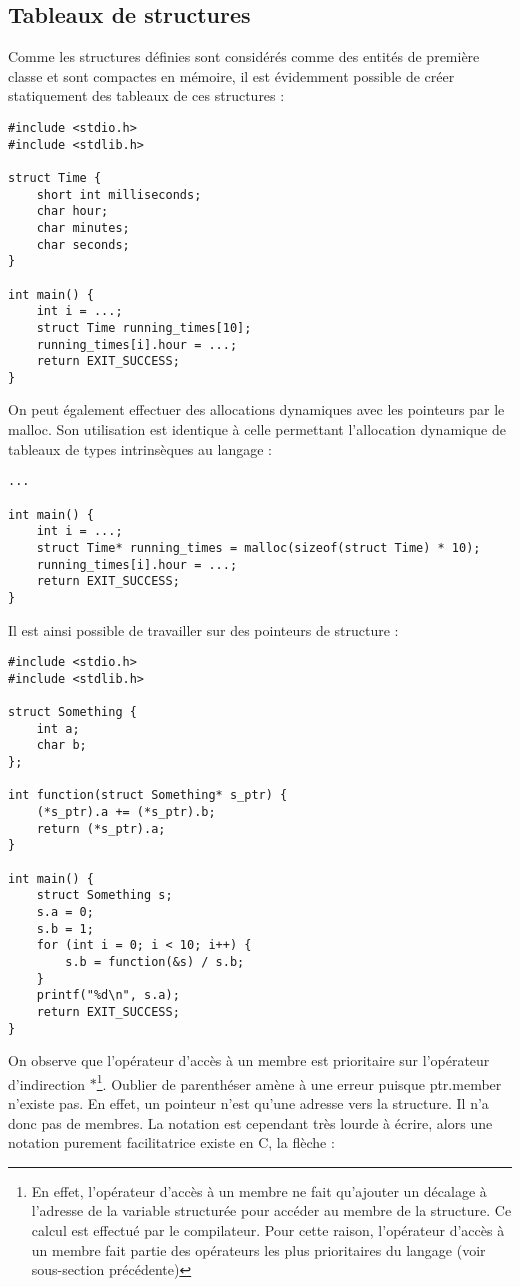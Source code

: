 \documentclass[../../../main.tex]{subfiles}
\begin{document}
\subsection{Tableaux de structures}
\label{sub:tableaux_de_structures}
Comme les structures définies sont considérés comme des entités de première classe et sont compactes en mémoire, il est évidemment possible de créer statiquement des tableaux de ces structures :
\begin{verbatim}
#include <stdio.h>
#include <stdlib.h>

struct Time {
	short int milliseconds;
	char hour;
	char minutes;
	char seconds;
}

int main() {
	int i = ...;
	struct Time running_times[10];
	running_times[i].hour = ...;
	return EXIT_SUCCESS;
}
\end{verbatim}
On peut également effectuer des allocations dynamiques avec les pointeurs par le \textsf{malloc}. Son utilisation est identique à celle permettant l'allocation dynamique de tableaux de types intrinsèques au langage :
\begin{verbatim}
...

int main() {
	int i = ...;
	struct Time* running_times = malloc(sizeof(struct Time) * 10);
	running_times[i].hour = ...;
	return EXIT_SUCCESS;
}
\end{verbatim}
Il est ainsi possible de travailler sur des pointeurs de structure :
\begin{verbatim}
#include <stdio.h>
#include <stdlib.h>

struct Something {
	int a;
	char b;
};

int function(struct Something* s_ptr) {
	(*s_ptr).a += (*s_ptr).b;
	return (*s_ptr).a;
}

int main() {
	struct Something s;
	s.a = 0;
	s.b = 1;
	for (int i = 0; i < 10; i++) {
		s.b = function(&s) / s.b;
	}
	printf("%d\n", s.a);
	return EXIT_SUCCESS;
}
\end{verbatim}
On observe que l'opérateur d'accès à un membre est prioritaire sur l'opérateur d'indirection $*$\footnote{En effet, l'opérateur d'accès à un membre ne fait qu'ajouter un décalage à l'adresse de la variable structurée pour accéder au membre de la structure. Ce calcul est effectué par le compilateur. Pour cette raison, l'opérateur d'accès à un membre fait partie des opérateurs les plus prioritaires du langage (voir sous-section précédente)}. Oublier de parenthéser amène à une erreur puisque \textsf{ptr.member} n'existe pas. En effet, un pointeur n'est qu'une adresse vers la structure. Il n'a donc pas de membres. \newline
La notation est cependant très lourde à écrire, alors une notation purement facilitatrice existe en C, la flèche :
 
\end{document}
